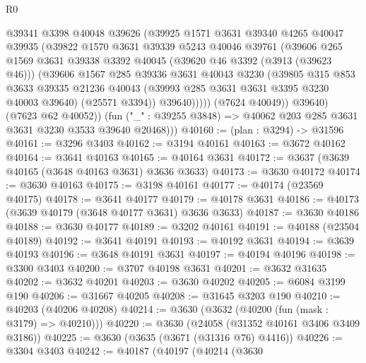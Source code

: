 \begin{lexlean}{R0}
\begin{coremodule}
                @39341
                @3398
                @40048
                @39626
                (@39925
                  @1571
                  @3631
                  @39340
                  @4265
                  @40047
                  @39935
                  (@39822
                    @1570
                    @3631
                    @39339
                    @5243
                    @40046
                    @39761
                    (@39606
                      @265
                      @1569
                      @3631
                      @39338
                      @3392
                      @40045
                      (@39620 @46 @3392 (@3913 (@39623 @46)))
                      (@39606
                        @1567
                        @285
                        @39336
                        @3631
                        @40043
                        @3230
                        (@39805
                          @315
                          @853
                          @3633
                          @39335
                          @21236
                          @40043
                          (@39993 @285 @3631 @3631 @3395 @3230 @40003 @39640)
                          (@25571 @3394))
                        @39640)))))
              (@7624 @40049))
            @39640)
          (@7623 @62 @40052))
        (fun ("_" : @39255 @3848) => @40062 @203 @285 @3631 @3631 @3230 @3533 @39640 @20468)))
@40160 := (plan : @3294) -> @31596
@40161 := @3296 @3403
@40162 := @3194 @40161
@40163 := @3672 @40162
@40164 := @3641 @40163
@40165 := @40164 @3631
@40172 := @3637 (@3639 @40165 (@3648 @40163 @3631) @3636 @3633)
@40173 := @3630 @40172
@40174 := @3630 @40163
@40175 := @3198 @40161
@40177 := @40174 (@23569 @40175)
@40178 := @3641 @40177
@40179 := @40178 @3631
@40186 := @40173 (@3639 @40179 (@3648 @40177 @3631) @3636 @3633)
@40187 := @3630 @40186
@40188 := @3630 @40177
@40189 := @3202 @40161
@40191 := @40188 (@23504 @40189)
@40192 := @3641 @40191
@40193 := @40192 @3631
@40194 := @3639 @40193
@40196 := @3648 @40191 @3631
@40197 := @40194 @40196
@40198 := @3300 @3403
@40200 := @3707 @40198 @3631
@40201 := @3632 @31635
@40202 := @3632 @40201
@40203 := @3630 @40202
@40205 := @6084 @3199 @190
@40206 := @31667 @40205
@40208 := @31645 @3203 @190
@40210 := @40203 (@40206 @40208)
@40214 := @3630 (@3632 (@40200 (fun (mask : @3179) => @40210)))
@40220 := @3630 (@24058 (@31352 @40161 @3406 @3409 @3186))
@40225 := @3630 (@3635 (@3671 (@31316 @76) @4416))
@40226 := @3304 @3403
@40242 := @40187
    (@40197
      (@40214
        (@3630

\end{coremodule}
\end{lexlean}
